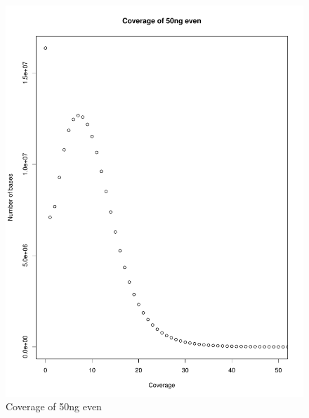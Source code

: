 \documentclass[a4paper,12pt]{report}
\begin{document}
\begin{figure}[ht!]
  \centering
    \includegraphics[width=\textwidth]{figures/coverageperbase-50ng_even.pdf}
  \caption{Coverage of 50ng even}
  \label{fig:coverage50ngeven}
\end{figure}
\end{document}
